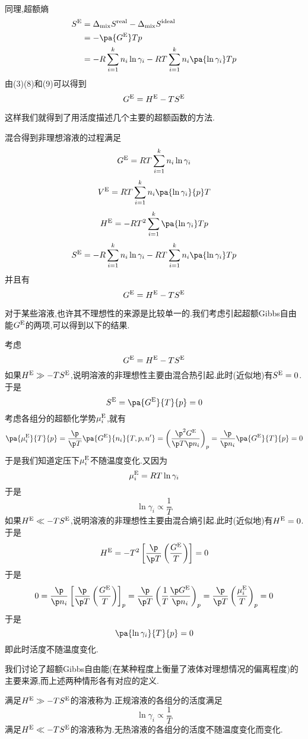 \documentclass{ctexart}
\begin{document}
\begin{derivation}
\begin{equation}
\begin{aligned}
        \end{aligned}
    \end{equation}
    同理,超额熵
    \begin{equation}
        \begin{aligned}
            S^{\text E}
            &= \Delta_{\text{mix}}S^{\text{real}}-\Delta_{\text{mix}}S^{\text{ideal}} \\
            &= -\pa{G^\text E}Tp \\
            &= -R\sum_{i=1}^{k}n_i\ln\gamma_i-RT\sum_{i=1}^{k}n_i\pa{\ln\gamma_i}Tp
        \end{aligned}
    \end{equation}
    由(3)(8)和(9)可以得到
    \[G^\text E=H^\text E-TS^\text E\]
    
\end{derivation}
这样我们就得到了用活度描述几个主要的超额函数的方法.
\begin{theorem}[4C.5.5 混合得到非理想溶液的热力学函数变化]
    混合得到非理想溶液的过程满足
    \[G^\text E=RT\sum_{i=1}^{k}n_i\ln\gamma_i\]
    \[V^\text E=RT\sum_{i=1}^{k}n_i\pa{\ln\gamma_i}{p}T\]
    \[H^\text E=-RT^2\sum_{i=1}^{k}\pa{\ln\gamma_i}Tp\]
    \[S^\text E=-R\sum_{i=1}^{k}n_i\ln\gamma_i-RT\sum_{i=1}^{k}n_i\pa{\ln\gamma_i}Tp\]
    并且有
    \[G^\text E=H^\text E-TS^\text E\]

\end{theorem}
对于某些溶液,也许其不理想性的来源是比较单一的.我们考虑引起超额Gibbs自由能$G^\text E$的两项,可以得到以下的结果.
\begin{derivation}
    考虑
    \[G^\text E=H^\text E-TS^\text E\]
    如果$H^\text E\gg-TS^\text E$,说明溶液的非理想性主要由混合热引起.此时(近似地)有$S^\text E=0$.于是
    \[S^\text E=\pa{G^\text E}{T}{p}=0\]
    考虑各组分的超额化学势$\mu_i^\text E$,就有
    \[\pa{\mu_i^\text E}{T}{p}=\dfrac{\p}{\p T}\pa{G^\text E}{n_i}{T,p,n'}
    =\left(\dfrac{\p^2 G^\text E}{\p T\p n_i}\right)_p=\dfrac{\p}{\p n_i}\pa{G^\text E}{T}{p}=0\]
    于是我们知道定压下$\mu_i^\text E$不随温度变化.又因为
    \[\mu_i^\text E=RT\ln\gamma_i\]
    于是
    \[\ln\gamma_i\propto\dfrac{1}{T}\]
    如果$H^\text E\ll-TS^\text E$,说明溶液的非理想性主要由混合熵引起.此时(近似地)有$H^\text E=0$.于是
    \[H^\text E=-T^2\left[\dfrac{\p}{\p T}\left(\dfrac{G^\text E}{T}\right)\right]=0\]
    于是
    \[0=\dfrac{\p}{\p n_i}\left[\dfrac{\p}{\p T}\left(\dfrac{G^\text E}{T}\right)\right]_p
    =\dfrac{\p}{\p T}\left(\dfrac{1}{T}\dfrac{\p G^\text E}{\p n_i}\right)_p=\dfrac{\p}{\p T}\left(\dfrac{\mu_i^\text E}{T}\right)_p=0\]
    于是
    \[\pa{\ln\gamma_i}{T}{p}=0\]
    即此时活度不随温度变化.
\end{derivation}
我们讨论了超额Gibbs自由能(在某种程度上衡量了液体对理想情况的偏离程度)的主要来源,而上述两种情形各有对应的定义.
\begin{definition}[4C.5.6 正规溶液和无热溶液]
    满足$H^\text E\gg-TS^\text E$的溶液称为.正规溶液的各组分的活度满足
    \[\ln\gamma_i\propto\dfrac{1}{T}\]
    满足$H^\text E\ll-TS^\text E$的溶液称为.无热溶液的各组分的活度不随温度变化而变化.
\end{definition}
\end{document}
